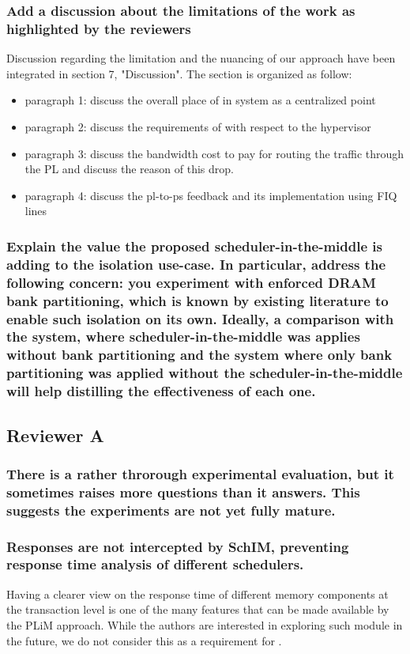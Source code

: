         \subsubsection{Add a discussion about the limitations of the work as highlighted by the reviewers}
            Discussion regarding the limitation and the nuancing of our approach have been integrated in section 7, "Discussion".
            The section is organized as follow:
            \begin{itemize}
                \item paragraph 1: discuss the overall place of \schim in system as a centralized point
                \item paragraph 2: discuss the requirements of \schim with respect to the hypervisor
                \item paragraph 3: discuss the bandwidth cost to pay for routing the traffic through the PL and discuss the reason of this drop.
                \item paragraph 4: discuss the pl-to-ps feedback and its implementation using FIQ lines
            \end{itemize}

        \subsubsection{Explain the value the proposed scheduler-in-the-middle is adding to the isolation use-case. In particular, address the following concern: you experiment with enforced DRAM bank partitioning, which is known by existing literature to enable such isolation on its own. Ideally, a comparison with the system, where scheduler-in-the-middle was applies without bank partitioning and the system where only bank partitioning was applied without the scheduler-in-the-middle will help distilling the effectiveness of each one.}


    \subsection{Reviewer A}
        \subsubsection{There is a rather throrough experimental evaluation, but it sometimes raises more questions than it answers. This suggests the experiments are not yet fully mature.}


        \subsubsection{Responses are not intercepted by SchIM, preventing response time analysis of different schedulers.}
            Having a clearer view on the response time of different memory components at the transaction level is one of the many features that can be made available by the PLiM approach. While the authors are interested in exploring such module in the future, we do not consider this as a requirement for \schim.

